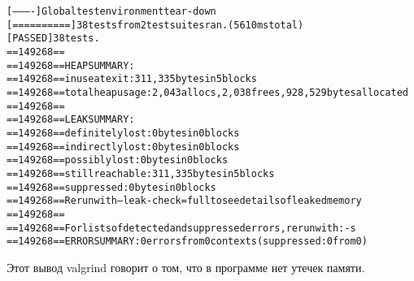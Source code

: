 \begin{alltt}
    [----------] Global test environment tear-down
    [==========] 38 tests from 2 test suites ran. (5610 ms total)
    [  PASSED  ] 38 tests.
    ==149268== 
    ==149268== HEAP SUMMARY:
    ==149268==     in use at exit: 311,335 bytes in 5 blocks
    ==149268==   total heap usage: 2,043 allocs, 2,038 frees, 928,529 bytes allocated
    ==149268== 
    ==149268== LEAK SUMMARY:
    ==149268==    definitely lost: 0 bytes in 0 blocks
    ==149268==    indirectly lost: 0 bytes in 0 blocks
    ==149268==      possibly lost: 0 bytes in 0 blocks
    ==149268==    still reachable: 311,335 bytes in 5 blocks
    ==149268==         suppressed: 0 bytes in 0 blocks
    ==149268== Rerun with --leak-check=full to see details of leaked memory
    ==149268== 
    ==149268== For lists of detected and suppressed errors, rerun with: -s
    ==149268== ERROR SUMMARY: 0 errors from 0 contexts (suppressed: 0 from 0)
\end{alltt}

Этот вывод valgrind говорит о том, что в программе нет утечек памяти.

\pagebreak